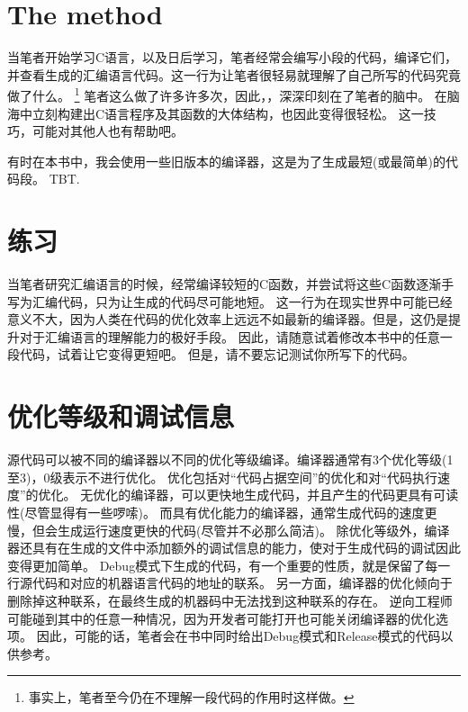 \section{The method}

当笔者开始学习C语言，以及日后学习，笔者经常会编写小段的代码，编译它们，并查看生成的汇编语言代码。这一行为让笔者很轻易就理解了自己所写的代码究竟做了什么。
\footnote{事实上，笔者至今仍在不理解一段代码的作用时这样做。}
笔者这么做了许多许多次，因此，，深深印刻在了笔者的脑中。
在脑海中立刻构建出C语言程序及其函数的大体结构，也因此变得很轻松。
这一技巧，可能对其他人也有帮助吧。


有时在本书中，我会使用一些旧版本的编译器，这是为了生成最短(或最简单)的代码段。
\ac{TBT}.
\section*{练习}

当笔者研究汇编语言的时候，经常编译较短的C函数，并尝试将这些C函数逐渐手写为汇编代码，只为让生成的代码尽可能地短。
这一行为在现实世界中可能已经意义不大，因为人类在代码的优化效率上远远不如最新的编译器。但是，这仍是提升对于汇编语言的理解能力的极好手段。
因此，请随意试着修改本书中的任意一段代码，试着让它变得更短吧。
但是，请不要忘记测试你所写下的代码。

\section*{优化等级和调试信息}

源代码可以被不同的编译器以不同的优化等级编译。编译器通常有3个优化等级(1至3)，0级表示不进行优化。
优化包括对“代码占据空间”的优化和对“代码执行速度”的优化。
无优化的编译器，可以更快地生成代码，并且产生的代码更具有可读性(尽管显得有一些啰嗦)。
而具有优化能力的编译器，通常生成代码的速度更慢，但会生成运行速度更快的代码(尽管并不必那么简洁)。
除优化等级外，编译器还具有在生成的文件中添加额外的调试信息的能力，使对于生成代码的调试因此变得更加简单。
Debug模式下生成的代码，有一个重要的性质，就是保留了每一行源代码和对应的机器语言代码的地址的联系。
另一方面，编译器的优化倾向于删除掉这种联系，在最终生成的机器码中无法找到这种联系的存在。
逆向工程师可能碰到其中的任意一种情况，因为开发者可能打开也可能关闭编译器的优化选项。
因此，可能的话，笔者会在书中同时给出Debug模式和Release模式的代码以供参考。
